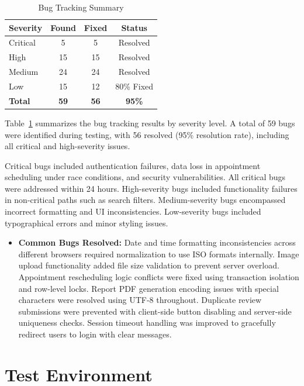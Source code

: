 \begin{table}[H]
    \centering
    \small
    \caption{Bug Tracking Summary}
    \label{tab:bugs}
    \begin{tabular}{|p{2.5cm}|c|c|c|}
        \hline
        \textbf{Severity} & \textbf{Found} & \textbf{Fixed} & \textbf{Status} \\
        \hline
        Critical & 5 & 5 & Resolved \\
        \hline
        High & 15 & 15 & Resolved \\
        \hline
        Medium & 24 & 24 & Resolved \\
        \hline
        Low & 15 & 12 & 80\% Fixed \\
        \hline
        \textbf{Total} & \textbf{59} & \textbf{56} & \textbf{95\%} \\
        \hline
    \end{tabular}
\end{table}
\noindent Table~\ref{tab:bugs} summarizes the bug tracking results by severity level. A total of 59 bugs were identified during testing, with 56 resolved (95\% resolution rate), including all critical and high-severity issues.

\justifying
\noindent Critical bugs included authentication failures, data loss in appointment scheduling under race conditions, and security vulnerabilities. All critical bugs were addressed within 24 hours. High-severity bugs included functionality failures in non-critical paths such as search filters. Medium-severity bugs encompassed incorrect formatting and UI inconsistencies. Low-severity bugs included typographical errors and minor styling issues.

\begin{itemize}
    \item \textbf{Common Bugs Resolved:} Date and time formatting inconsistencies across different browsers required normalization to use ISO formats internally. Image upload functionality added file size validation to prevent server overload. Appointment rescheduling logic conflicts were fixed using transaction isolation and row-level locks. Report PDF generation encoding issues with special characters were resolved using UTF-8 throughout. Duplicate review submissions were prevented with client-side button disabling and server-side uniqueness checks. Session timeout handling was improved to gracefully redirect users to login with clear messages.
\end{itemize}

\section{Test Environment}

